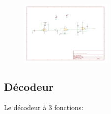 \documentclass[french]{layout/Report}
\begin{document}
\begin{description}[leftmargin=!,labelwidth=3cm, labelindent=\parindent]
		\begin{figure}[H]
			\centering
			\includegraphics[width=0.4\textwidth]{fig/schmitt_trigger.pdf}
		\end{figure}
\end{description}

\subsection{Décodeur}
Le décodeur à 3 fonctions:
\end{document}
